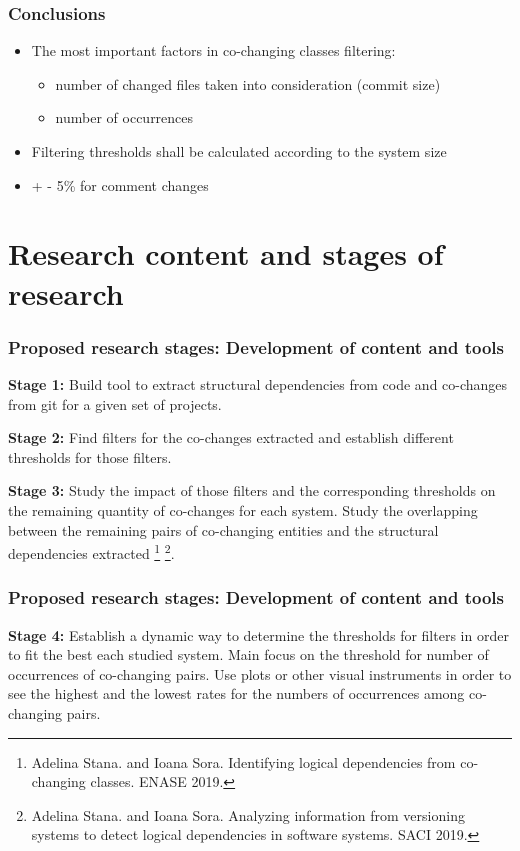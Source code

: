 \documentclass{beamer}
\begin{document}


 \begin{frame}
\frametitle{Conclusions }
 \begin{itemize}
   	 \item The most important factors in co-changing classes filtering:
 \begin{itemize}
   	 \item  number of changed files taken into consideration (commit size)
	 \item number of occurrences 
    \end{itemize}
      	 \item Filtering thresholds shall be calculated according to the system size
     	 \item  + - 5\% for comment changes
    \end{itemize}

\end{frame}

\section{Research content and stages of research}
 \begin{frame}
\frametitle{Proposed research stages: Development of content and tools }

\textbf{Stage 1:} Build tool to extract structural dependencies from code and co-changes from git for a given set of projects.


\textbf{Stage 2:} Find filters for the co-changes extracted and establish different thresholds for those filters.


\textbf{Stage 3:} Study the impact of those filters and the corresponding thresholds on the remaining quantity of co-changes for each system.
Study the overlapping between the remaining pairs of co-changing entities and the structural dependencies extracted \footnote{Adelina Stana. and Ioana Sora. Identifying logical dependencies from
co-changing classes.  ENASE 2019.}  \footnote{Adelina Stana. and Ioana Sora. Analyzing information from versioning systems
to detect logical dependencies in software systems.  SACI 2019.}. 



\end{frame}


 \begin{frame}
\frametitle{Proposed research stages: Development of content and tools }

\textbf{Stage 4:} Establish a dynamic way to determine the thresholds for filters in order to fit the best each studied system. Main focus on the threshold for number of occurrences of co-changing pairs.
Use plots or other visual instruments in order to see the highest and the lowest rates for the numbers of occurrences among co-changing pairs.

\end{frame}
\end{document}

